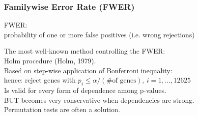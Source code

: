 \documentclass[xcolor={pdftex,dvipsnames,table}]{beamer}
\newcommand{\bb}[1]{\begin{block}{#1}}
\newcommand{\eb}{\end{block}}
\begin{document}


\begin{frame}
\frametitle{Familywise Error Rate (FWER)}
\textcolor{myblue}{FWER: \\ probability of one or more false positives (i.e. wrong rejections)} 


\bb{}
The most well-known method controlling the FWER: \\
 \textcolor{myblue}{Holm} procedure (Holm, 1979). \\
Based on step-wise application of Bonferroni inequality:\\
hence: reject genes with $p_{i}\leq \alpha/(\textrm{\# of genes}),\ i=1,\ldots,12625$\\
\pause
Is valid for every form of \textcolor{myblue}{dependence} among p-values. \\
\pause
BUT becomes \textcolor{myblue}{very conservative} when dependencies are strong.\\
\pause
Permutation tests are often a solution.
\eb
\end{frame}
\end{document}
